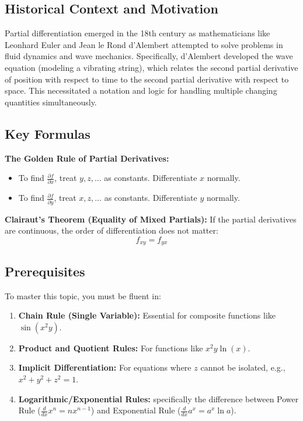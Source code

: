 \documentclass{article}
\begin{document}
\subsection{Historical Context and Motivation}
Partial differentiation emerged in the 18th century as mathematicians like Leonhard Euler and Jean le Rond d'Alembert attempted to solve problems in fluid dynamics and wave mechanics. Specifically, d'Alembert developed the wave equation (modeling a vibrating string), which relates the second partial derivative of position with respect to time to the second partial derivative with respect to space. This necessitated a notation and logic for handling multiple changing quantities simultaneously.

\subsection{Key Formulas}
\textbf{The Golden Rule of Partial Derivatives:}
\begin{itemize}
    \item To find $\frac{\partial f}{\partial x}$, treat $y, z, \dots$ as constants. Differentiate $x$ normally.
    \item To find $\frac{\partial f}{\partial y}$, treat $x, z, \dots$ as constants. Differentiate $y$ normally.
\end{itemize}

\textbf{Clairaut's Theorem (Equality of Mixed Partials):}
If the partial derivatives are continuous, the order of differentiation does not matter:
\[ f_{xy} = f_{yx} \]

\subsection{Prerequisites}
To master this topic, you must be fluent in:
\begin{enumerate}
    \item \textbf{Chain Rule (Single Variable):} Essential for composite functions like $\sin(x^2y)$.
    \item \textbf{Product and Quotient Rules:} For functions like $x^2 y \ln(x)$.
    \item \textbf{Implicit Differentiation:} For equations where $z$ cannot be isolated, e.g., $x^2 + y^2 + z^2 = 1$.
    \item \textbf{Logarithmic/Exponential Rules:} specifically the difference between Power Rule ($\frac{d}{dx} x^n = nx^{n-1}$) and Exponential Rule ($\frac{d}{dx} a^x = a^x \ln a$).
\end{enumerate}
\end{document}
